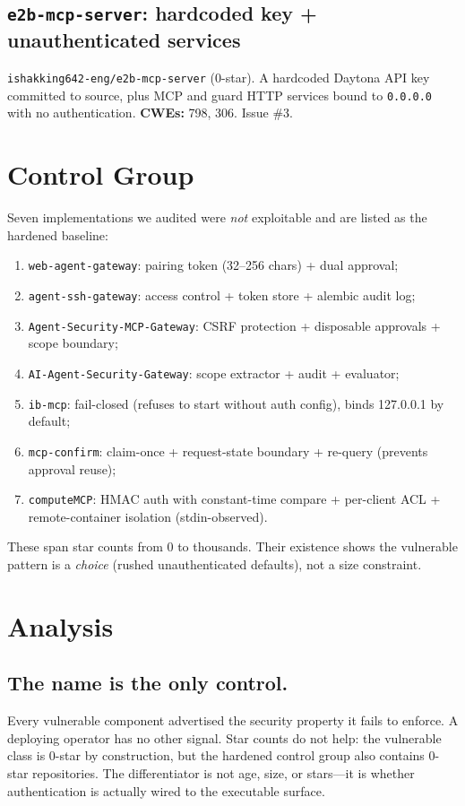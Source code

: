 \documentclass{llncs}
\begin{document}
\subsection{\texttt{e2b-mcp-server}: hardcoded key + unauthenticated services}\label{sub:e2b}
\texttt{ishakking642-eng/e2b-mcp-server} (0-star). A hardcoded Daytona API key committed to source, plus MCP and guard HTTP services bound to \texttt{0.0.0.0} with no authentication. \textbf{CWEs:} 798, 306. Issue \#3.

\section{Control Group}\label{sec:control}
Seven implementations we audited were \emph{not} exploitable and are listed as the hardened baseline:
\begin{enumerate}
\item \texttt{web-agent-gateway}: pairing token (32--256 chars) + dual approval;
\item \texttt{agent-ssh-gateway}: access control + token store + alembic audit log;
\item \texttt{Agent-Security-MCP-Gateway}: CSRF protection + disposable approvals + scope boundary;
\item \texttt{AI-Agent-Security-Gateway}: scope extractor + audit + evaluator;
\item \texttt{ib-mcp}: fail-closed (refuses to start without auth config), binds 127.0.0.1 by default;
\item \texttt{mcp-confirm}: claim-once + request-state boundary + re-query (prevents approval reuse);
\item \texttt{computeMCP}: HMAC auth with constant-time compare + per-client ACL + remote-container isolation (stdin-observed).
\end{enumerate}
These span star counts from 0 to thousands. Their existence shows the vulnerable pattern is a \emph{choice} (rushed unauthenticated defaults), not a size constraint.

\section{Analysis}\label{sec:analysis}
\subsection{The name is the only control.}\label{sub:name}
Every vulnerable component advertised the security property it fails to enforce. A deploying operator has no other signal. Star counts do not help: the vulnerable class is 0-star by construction, but the hardened control group also contains 0-star repositories. The differentiator is not age, size, or stars---it is whether authentication is actually wired to the executable surface.
\end{document}
